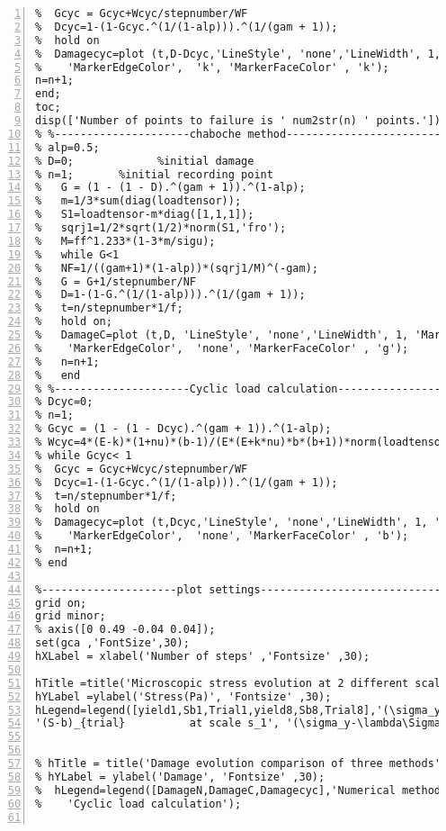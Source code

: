 \begin{lstlisting}[numbers=left, numberstyle=\tiny, keywordstyle=\color{blue!100}, commentstyle=\color{red!30!green!100!blue!100}, frame=shadowbox, rulesepcolor=\color{red!20!green!20!blue!20}]
%---------------------Difference between cyclic load calculation and numerical method as function of time-----------------------------
%  Gcyc = Gcyc+Wcyc/stepnumber/WF
%  Dcyc=1-(1-Gcyc.^(1/(1-alp))).^(1/(gam + 1));
%  hold on
%  Damagecyc=plot (t,D-Dcyc,'LineStyle', 'none','LineWidth', 1, 'Marker', 'o', 'MarkerSize', 6, ...
%    'MarkerEdgeColor',  'k', 'MarkerFaceColor' , 'k');
n=n+1;
end;
toc;
disp(['Number of points to failure is ' num2str(n) ' points.']);
% %---------------------chaboche method-----------------------------
% alp=0.5;
% D=0;             %initial damage
% n=1;       %initial recording point
%   G = (1 - (1 - D).^(gam + 1)).^(1-alp);
%   m=1/3*sum(diag(loadtensor));
%   S1=loadtensor-m*diag([1,1,1]);
%   sqrj1=1/2*sqrt(1/2)*norm(S1,'fro');
%   M=ff^1.233*(1-3*m/sigu);
%   while G<1
%   NF=1/((gam+1)*(1-alp))*(sqrj1/M)^(-gam);
%   G = G+1/stepnumber/NF
%   D=1-(1-G.^(1/(1-alp))).^(1/(gam + 1));
%   t=n/stepnumber*1/f;
%   hold on;
%   DamageC=plot (t,D, 'LineStyle', 'none','LineWidth', 1, 'Marker', 'o', 'MarkerSize', 6, ...
%    'MarkerEdgeColor',  'none', 'MarkerFaceColor' , 'g');
%   n=n+1;
%   end
% %---------------------Cyclic load calculation-----------------------------
% Dcyc=0;
% n=1;
% Gcyc = (1 - (1 - Dcyc).^(gam + 1)).^(1-alp);
% Wcyc=4*(E-k)*(1+nu)*(b-1)/(E*(E+k*nu)*b*(b+1))*norm(loadtensor-(1/3*sum(diag(loadtensor)))*diag([1,1,1]),'fro').^(b+1)*y.^(1-b) ;
% while Gcyc< 1
%  Gcyc = Gcyc+Wcyc/stepnumber/WF
%  Dcyc=1-(1-Gcyc.^(1/(1-alp))).^(1/(gam + 1));
%  t=n/stepnumber*1/f;
%  hold on
%  Damagecyc=plot (t,Dcyc,'LineStyle', 'none','LineWidth', 1, 'Marker', 'o', 'MarkerSize', 6, ...
%    'MarkerEdgeColor',  'none', 'MarkerFaceColor' , 'b');
%  n=n+1;
% end

%---------------------plot settings-----------------------------
grid on;
grid minor;
% axis([0 0.49 -0.04 0.04]);
set(gca ,'FontSize',30);
hXLabel = xlabel('Number of steps' ,'Fontsize' ,30);

hTitle =title('Microscopic stress evolution at 2 different scales ' ,'Fontsize' ,30);
hYLabel =ylabel('Stress(Pa)', 'Fontsize' ,30);
hLegend=legend([yield1,Sb1,Trial1,yield8,Sb8,Trial8],'(\sigma_y-\lambda\Sigma_H)/s_1     at scale s_1','(S-b)               at scale s_1',...
'(S-b)_{trial}          at scale s_1', '(\sigma_y-\lambda\Sigma_H)/s_8     at scale s_{8}','(S-b)               at scale s_{8}','(S-b)_{trial}          at scale s_{8}');


% hTitle = title('Damage evolution comparison of three methods' ,'Fontsize' ,30);
% hYLabel = ylabel('Damage', 'Fontsize' ,30);
%  hLegend=legend([DamageN,DamageC,Damagecyc],'Numerical method','Chaboche method',...
%    'Cyclic load calculation');


\end{lstlisting}
